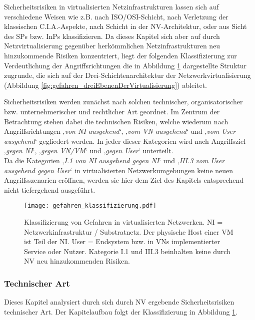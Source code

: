 Sicherheitsrisiken in virtualisierten Netzinfrastrukturen lassen sich auf verschiedene Weisen wie z.B. nach ISO/OSI-Schicht, nach Verletzung der klassischen C.I.A.-Aspekte, nach Schicht in der NV-Architektur, oder aus Sicht des SPs bzw. InPs klassifizieren. Da dieses Kapitel sich aber auf durch Netzvirtualisierung gegenüber herkömmlichen Netzinfrastrukturen neu hinzukommende Risiken konzentriert, liegt der folgenden Klassifizierung zur Verdeutlichung der Angriffsrichtungen die in Abbildung \ref{fig:gefahren_klassifizierung} dargestellte Struktur zugrunde, die sich auf der Drei-Schichtenarchitektur der Netzwerkvirtualisierung (Abbildung \ref{fig:gefahren_dreiEbenenDerVirtualisierung}) ableitet.

Sicherheitsrisiken werden zunächst nach solchen technischer, organisatorischer bzw. unternehmerischer und rechtlicher Art geordnet. Im Zentrum der Betrachtung stehen dabei die technischen Risiken, welche wiederum nach Angriffsrichtungen ‚\textit{von NI ausgehend}‘, ‚\textit{vom VN ausgehend}‘ und ‚\textit{vom User ausgehend}‘ gegliedert werden. In jeder dieser Kategorien wird nach Angriffsziel ‚\textit{gegen NI}‘, ‚\textit{gegen VN/VM}‘ und ‚\textit{gegen User}‘ unterteilt. \\
Da die Kategorien ‚\textit{I.1 von NI ausgehend gegen NI}‘ und ‚\textit{III.3 vom User ausgehend gegen User}‘ in virtualisierten Netzwerkumgebungen keine neuen Angriffsszenarien eröffnen, werden sie hier dem Ziel des Kapitels entsprechend nicht tiefergehend ausgeführt. 


\begin{figure}[htb]
	\begin{center}
	\texttt{[image: gefahren\_klassifizierung.pdf]}
	\caption{\label{fig:gefahren_klassifizierung} Klassifizierung von Gefahren in virtualisierten Netzwerken. 
		\newline NI = Netzwerkinfrastruktur / Substratnetz. Der physische Host einer VM ist Teil der NI.
		\newline User = Endsystem bzw. in VNs implementierter Service oder Nutzer.
		\newline Kategorie I.1 und III.3 beinhalten keine durch NV neu hinzukommenden Risiken.}
	\end{center}
\end{figure}





\subsubsection{Technischer Art}
\label{subsubsec:gefahren_virt_technisch}
Dieses Kapitel analysiert durch sich durch NV ergebende Sicherheitsrisiken technischer Art.
Der Kapitelaufbau folgt der Klassifizierung in Abbildung \ref{fig:gefahren_klassifizierung}. 



